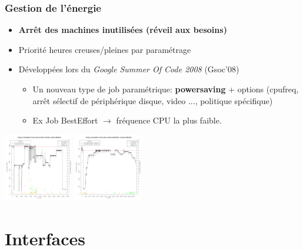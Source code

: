 \documentclass{beamer}
\begin{document}
\begin{frame}
  \frametitle{Gestion de l'énergie} \hypertarget{energy}{}
  \begin{itemize}
    \item {\bf Arrêt des machines inutilisées (réveil aux besoins)}
    \item Priorité heures creuses/pleines par paramétrage
		\item Développées lors du {\em Google Summer Of Code 2008} (Gsoc'08)
    \begin{itemize}
       \item Un nouveau type de job paramétrique:  {\bf powersaving} + options (cpufreq, arrêt sélectif de périphérique disque, video ..., politique spécifique)
       \item Ex Job BestEffort $\rightarrow$ fréquence CPU la plus faible.
    \end{itemize}
  \end{itemize}
  \begin{center}
    \includegraphics[width=3cm]{img/energy50.png}
    \includegraphics[width=3cm]{img/energy90.png}
    \\\hyperlink{energy-appendix}{}
  \end{center}
\end{frame}


\section{Interfaces}

\end{document}
